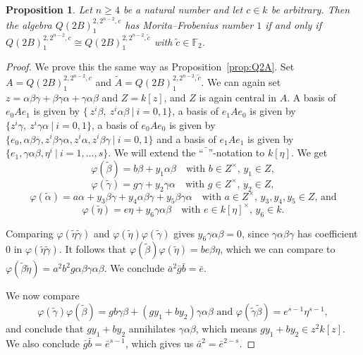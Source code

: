 \documentclass{amsart}
\theoremstyle{plain}\newtheorem{Theorem}{Theorem}[section]
\theoremstyle{plain}\newtheorem{Conjecture}[Theorem]{Conjecture}
\theoremstyle{plain}\newtheorem{Corollary}[Theorem]{Corollary}
\theoremstyle{plain}\newtheorem{Lemma}[Theorem]{Lemma}
\theoremstyle{plain}\newtheorem{Proposition}[Theorem]{Proposition}
\theoremstyle{definition}\newtheorem{Definition}[Theorem]{Definition}
\theoremstyle{definition}\newtheorem{Example}[Theorem]{Example}
\theoremstyle{definition}\newtheorem{Examples}[Theorem]{Examples}
\theoremstyle{definition}\newtheorem{Exercise}[Theorem]{Exercise}
\theoremstyle{definition}\newtheorem{Notation}[Theorem]{Notation}
\theoremstyle{definition}\newtheorem{Remark}[Theorem]{Remark}
\theoremstyle{definition}\newtheorem{Remarks}[Theorem]{Remarks}
\numberwithin{equation}{section}
\begin{document}
\begin{Proposition}\label{prop:Q2B}
  Let $n\geq 4$ be a natural number and let $c\in k$ be arbitrary. Then the algebra $Q(2B)_1^{2,2^{n-2},c}$ has Morita--Frobenius number $1$ if and only if $Q(2B)_1^{2,2^{n-2},c} \cong Q(2B)_1^{2,2^{n-2},\tilde c}$ with $\tilde c\in \mathbb F_2$.
\end{Proposition}
\begin{proof}
    We prove this the same way as Proposition~\ref{prop:Q2A}. Set $A=Q(2B)_1^{2,2^{n-2},c}$ and $\tilde A = Q(2B)_1^{2,2^{n-2},\tilde c}$. We can again set $z=\alpha\beta\gamma+\beta\gamma\alpha+\gamma\alpha\beta$ and $Z=k[z]$, and $Z$ is again central in $A$. A basis of $e_0 A e_1$ is given by $\{\ z^i\beta, \ z^i\alpha\beta \ | \ i=0,1 \}$, a basis of $e_1 A e_0$ is given by 
    $\{ z^i\gamma, \ z^i\gamma\alpha \ | \ i=0,1 \}$, a basis of 
    $e_0 A e_0$ is given by $\{e_0, \alpha\beta\gamma, z^i\beta\gamma\alpha, z^i\alpha, z^i\beta\gamma \ | \ i=0,1\}$ and a basis of 
    $e_1 A e_1$ is given by $\{e_1, \gamma\alpha\beta, \eta^i \ | \ i=1,\ldots,s\}$. 
      We will extend the ``$\bar{\phantom f}$''-notation to $k[\eta]$. We get 
      $$
        \varphi(\tilde \beta)=b\beta + y_1 \alpha\beta \quad\textrm{with $b\in Z^\times$, $y_1\in Z$},
      $$
      $$
        \varphi(\tilde \gamma)=g\gamma + y_2 \gamma\alpha \quad\textrm{with $g\in Z^\times$, $y_2\in Z$},
      $$
      $$
        \varphi(\tilde \alpha)=a\alpha + y_3 \beta\gamma+y_4 \alpha\beta\gamma + y_5 \beta\gamma\alpha \quad\textrm{with $a\in Z^\times$, $y_3,y_4,y_5\in Z$}\textrm{, and}
      $$
      $$
        \varphi(\tilde \eta) = e \eta + y_6 \gamma\alpha\beta \quad\textrm{with $e\in k[\eta]^\times$, $y_6\in k$.}
      $$

      Comparing $\varphi(\tilde \eta \tilde \gamma)$ and $\varphi(\tilde \eta)\varphi(\tilde \gamma)$ gives $y_6 \gamma\alpha\beta=0$, since $\gamma\alpha\beta\gamma$ has coefficient $0$ in $\varphi(\tilde \eta \tilde \gamma)$. It follows that $\varphi(\tilde \beta)\varphi(\tilde \eta)= be\beta\eta$, which we can compare to $\varphi(\tilde \beta \tilde \eta)= a^2b^2g\alpha\beta\gamma\alpha\beta$. We conclude $\bar a^2\bar g\bar b=\bar e$.
      
      We now compare
      $$
        \varphi(\tilde \gamma)\varphi(\tilde\beta)=gb\gamma\beta+(gy_1+by_2)\gamma\alpha\beta \textrm{ and } \varphi(\tilde \gamma\tilde\beta)=e^{s-1}\eta^{s-1},
      $$
      and conclude that $gy_1+by_2$ annihilates $\gamma\alpha\beta$, which means $gy_1+by_2\in z^2k[z]$. We also conclude $\bar g\bar b= \bar e^{s-1}$, which gives us $\bar a^2 = \bar e^{2-s}$.


\end{proof}
\end{document}
